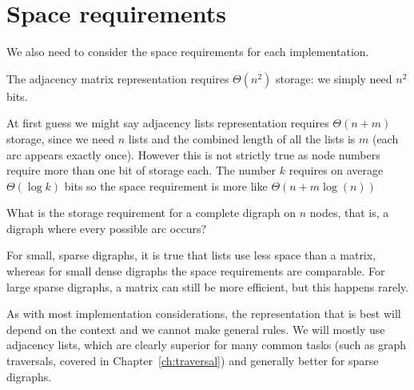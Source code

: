 \section{Space requirements}

We also need to consider the space requirements for each implementation. 

The adjacency matrix
representation requires $\Theta(n^2)$ storage: we simply need $n^2$
bits. 

At first guess we might say adjacency lists representation requires
$\Theta(n+m)$ storage, since we need $n$ lists and the combined length of all the lists is $m$ (each arc appears exactly once).
However this is not strictly true as node numbers require more than one bit of storage each. The number $k$ requires on average  $\Theta(\log k)$ bits so the space requirement is more like $\Theta(n+m \log(n))$ 


\beginboxedexample
What is the storage requirement for a complete digraph on $n$ nodes, that is, a digraph where every possible arc
occurs?
\endboxedexample{2cm}

For small, sparse digraphs,
it is true that lists use less space than a matrix, whereas for small
dense digraphs the space requirements are comparable. For large sparse
digraphs, a matrix can still be more efficient, but this happens rarely.

As with most implementation considerations, the representation that is best will depend on the context and we cannot make general rules.  We will mostly use adjacency lists, which are
clearly superior for many common tasks (such as graph traversals, covered
in Chapter~\ref{ch:traversal}) and generally better for sparse digraphs.


%

